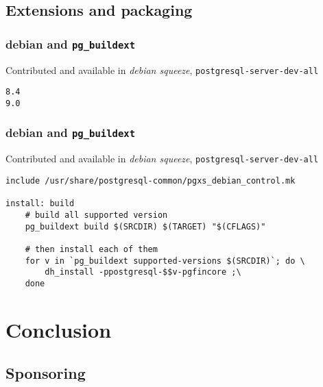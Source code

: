 \documentclass[english]{beamer}
\begin{document}
\subsection{Extensions and packaging}


\begin{frame}[fragile]
  \frametitle{debian and \texttt{pg\_buildext}}

  Contributed and available in \textit{debian squeeze},
  \texttt{postgresql-server-dev-all}
  \linebreak

  \begin{example}
\begin{verbatim}
8.4
9.0
\end{verbatim}
  \end{example}
\end{frame}

\begin{frame}[fragile]
  \frametitle{debian and \texttt{pg\_buildext}}

  Contributed and available in \textit{debian squeeze},
  \texttt{postgresql-server-dev-all}
  \linebreak

  \begin{example}
\begin{verbatim}
include /usr/share/postgresql-common/pgxs_debian_control.mk

install: build
	# build all supported version
	pg_buildext build $(SRCDIR) $(TARGET) "$(CFLAGS)"

	# then install each of them
	for v in `pg_buildext supported-versions $(SRCDIR)`; do \
		dh_install -ppostgresql-$$v-pgfincore ;\
	done
\end{verbatim}
  \end{example}
\end{frame}

\section{Conclusion}

\subsection{Sponsoring}
\end{document}
